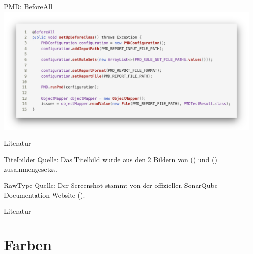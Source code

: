 \documentclass{sdqbeamer}
\begin{document}
\begin{frame}[fragile]{PMD: BeforeAll}
    \vspace{-0.5cm}
    \hspace{-0.7cm}
    \includegraphics[scale=0.23]{logos/CodeTestBeforeAll.png}
    
    
    
    
\end{frame}

\begin{frame}{Literatur}
\begin{exampleblock}{Titelbilder Quelle:}
    Das Titelbild wurde aus den 2 Bildern von (\cite{pmdLogo}) und  (\cite{sonarqubeLogo}) zusammengesetzt.
\end{exampleblock}
\begin{exampleblock} {RawType Quelle:}
    Der Screenshot stammt von der offiziellen SonarQube Documentation Website (\cite{rawTypeSQLink}).
    
\end{exampleblock}
\end{frame}

\begin{frame}{Literatur}
    \printbibliography
\end{frame}

\section{Farben}
\backupend
\end{document}
